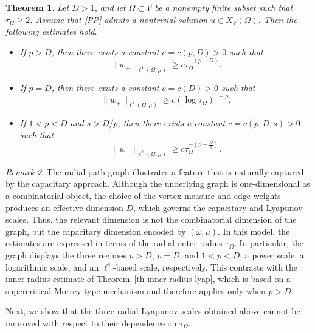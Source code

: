 \documentclass[twoside,12pt,letter]{article}
\theoremstyle{plain}
\newtheorem{theorem}{Theorem}[section]
\theoremstyle{definition}
\theoremstyle{remark}
\newtheorem{remark}[theorem]{Remark}
\numberwithin{equation}{section}
\begin{document}
\begin{theorem}\label{thm-radial-path-lyap}
Let \(D>1\), and let \(\Omega\subset V\) be a nonempty finite subset such that
\(\tau_\Omega\ge 2\). Assume that \eqref{PP} admits a nontrivial solution
\(u\in X_V(\Omega)\). Then the following estimates hold.
\begin{itemize}
\item[{\rm(i)}] If \(p>D\), then there exists a constant \(c=c(p,D)>0\) such
that
\[
\|w_+\|_{\ell^1(\Omega,\mu)}
\ge
c \tau_\Omega^{-(p-D)}.
\]

\item[{\rm(ii)}] If \(p=D\), then there exists a constant \(c=c(D)>0\) such
that
\[
\|w_+\|_{\ell^1(\Omega,\mu)}
\ge
c(\log \tau_\Omega)^{1-p}.
\]

\item[{\rm(iii)}] If \(1<p<D\) and \(s>D/p\), then there exists a constant
\(c=c(p,D,s)>0\) such that
\[
\|w_+\|_{\ell^s(\Omega,\mu)}
\ge
c \tau_\Omega^{-\left(p-\frac{D}{s}\right)}.
\]
\end{itemize}
\end{theorem}

\begin{remark}
The radial path graph illustrates a feature that is naturally captured by the
capacitary approach. Although the underlying graph is one-dimensional as a
combinatorial object, the choice of the vertex measure and edge weights
produces an effective dimension \(D\), which governs the capacitary and
Lyapunov scales. Thus, the relevant dimension is not the combinatorial
dimension of the graph, but the capacitary dimension encoded by
\((\omega,\mu)\). In this model, the estimates are expressed in terms of the
radial outer radius \(\tau_\Omega\). In particular, the graph displays the
three regimes \(p>D\), \(p=D\), and \(1<p<D\): a power scale, a logarithmic
scale, and an \(\ell^s\)-based scale, respectively. This contrasts with the
inner-radius estimate of Theorem~\ref{th-inner-radius-lyap}, which is based on
a supercritical Morrey-type mechanism and therefore applies only when \(p>D\).
\end{remark}

Next, we show that the three radial Lyapunov scales obtained above cannot be
improved with respect to their dependence on \(\tau_\Omega\).
\end{document}
